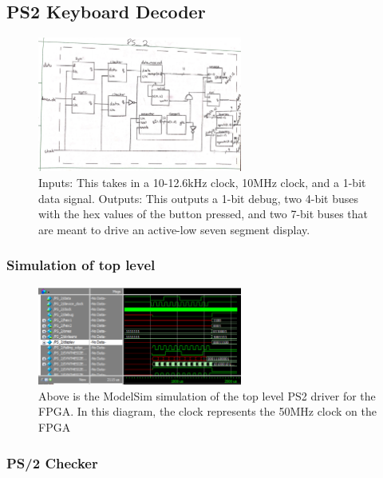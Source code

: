 \documentclass[a4paper]{article}
\begin{document}
\subsection{PS2 Keyboard Decoder}

\begin{figure}[H]
  \centering
    \includegraphics[width=0.6\textwidth,angle=90,origin=c]{images/block_diagrams/PS2/PS2Top.jpg}
	\caption{Inputs: This takes in a 10-12.6kHz clock, 10MHz clock, and a 1-bit data signal. \newline
	Outputs: This outputs a 1-bit debug, two 4-bit buses with the hex values of the button pressed, and two 7-bit buses that are meant to drive  an active-low seven segment display. \newline}
	\label{fig:PS2_decoder}
\end{figure}

\subsubsection{Simulation of top level}

\begin{figure}[H]
  \centering
    \includegraphics[width=0.6\textwidth]{images/ModelSim/PS2/PS2_Controller.png}
	\caption{Above is the ModelSim simulation of the top level PS2 driver for the FPGA. In this diagram, the clock represents the 50MHz clock on the FPGA}
	\label{fig:PS2_topsim}
\end{figure}

\subsubsection{PS/2 Checker}
\end{document}
